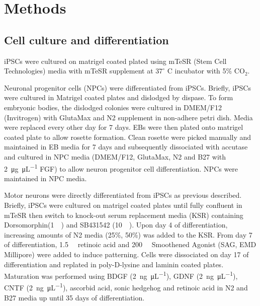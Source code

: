 \section{Methods}





\subsection{Cell culture and differentiation}

iPSCs were cultured on matrigel coated plated using mTeSR (Stem Cell Technologies) media with mTeSR supplement at $37^\circ$ C incubator with 5\% CO$_{2}$.\par

Neuronal progenitor cells (NPCs) were differentiated from iPSCs. Briefly, iPSCs were cultured in Matrigel coated plates and dislodged by dispase. To form embryonic bodies, the dislodged colonies were cultured in DMEM/F12 (Invitrogen) with GlutaMax and N2 supplement in non-adhere petri dish. Media were replaced every other day for 7 days. EBs were then plated onto matrigel coated plate to allow rosette formation. Clean rosette were picked manually and maintained in EB media for 7 days and subsequently dissociated with accutase and cultured in NPC media (DMEM/F12, GlutaMax, N2 and B27 with \SI[per-mode=symbol]{2}{\micro\gram\per\micro\liter} FGF) to allow neuron progenitor cell differentiation. NPCs were maintained in NPC media.

Motor neurons were directly differentiated from iPSCs as previous described\cite{Chambers:2009ey}. Briefly, iPSCs were cultured on matrigel coated plates until fully confluent in mTeSR then switch to knock-out serum replacement media (KSR) containing Dorsomorphin(\SI{1}{\micro\Molar}) and SB431542 (\SI{10}{\micro\Molar}). Upon day 4 of differentiation, increasing amounts of N2 media (25\%, 50\%) was added to the KSR. From day 7 of differentiation, \SI{1.5}{\micro\Molar} retinoic acid and \SI{200}{\nano\Molar} Smoothened Agonist (SAG, EMD Millipore) were added to induce patterning. Cells were dissociated on day 17 of differentiation and replated in poly-D-lysine and laminin coated plates. Maturation was performed using BDGF (\SI[per-mode=symbol]{2}{\nano\gram\per\micro\liter}), GDNF (\SI[per-mode=symbol]{2}{\nano\gram\per\micro\liter}), CNTF (\SI[per-mode=symbol]{2}{\nano\gram\per\micro\liter}), ascorbid acid, sonic hedgehog and retinoic acid in N2 and B27 media up until 35 days of differentiation.


